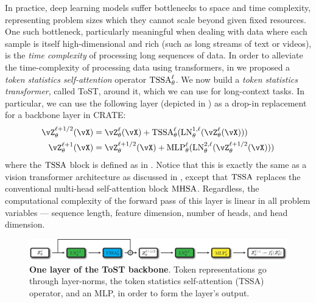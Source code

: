 \documentclass[../../book-main.tex]{subfiles}
\begin{document}
In practice, deep learning models suffer bottlenecks to space and time complexity, representing problem sizes which they cannot scale beyond given fixed resources. One such bottleneck, particularly meaningful when dealing with data where each sample is itself high-dimensional and rich (such as long streams of text or videos), is the \textit{time complexity} of processing long sequences of data. In order to alleviate the time-complexity of processing data using transformers, in  we proposed a \textit{token statistics self-attention} operator \(\operatorname{TSSA}_{\theta}^{\ell}\). We now build a \textit{token statistics transformer}, called ToST, around it, which we can use for long-context tasks. In particular, we can use the following layer (depicted in ) as a drop-in replacement for a backbone layer in CRATE:
\begin{align}
    \vZ_{\theta}^{\ell + 1/2}(\vX)
    &= \vZ_{\theta}^{\ell}(\vX) + \TSSA_{\theta}^{\ell}(\LN_{\theta}^{1, \ell}(\vZ_{\theta}^{\ell}(\vX))) \\ 
    \vZ_{\theta}^{\ell + 1}(\vX)
    &= \vZ_{\theta}^{\ell + 1/2}(\vX) + \MLP_{\theta}^{\ell}(\LN_{\theta}^{2, \ell}(\vZ_{\theta}^{\ell + 1/2}(\vX)))
\end{align}
where the \(\operatorname{TSSA}\) block is defined as in . Notice that this is exactly the same as a vision transformer architecture as discussed in , except that \(\operatorname{TSSA}\) replaces the conventional multi-head self-attention block \(\operatorname{MHSA}\). Regardless, the computational complexity of the forward pass of this layer is linear in all problem variables --- sequence length, feature dimension, number of heads, and head dimension.

\begin{figure}
    \centering 
    \includegraphics[width=\textwidth]{chapters/chapter7/figs/tost_backbone.pdf}
    \caption{\small\textbf{One layer of the ToST backbone}. Token representations go through layer-norms, the token statistics self-attention (TSSA) operator, and an MLP, in order to form the layer's output.}
    \label{fig:tost_backbone}
\end{figure}
\end{document}
